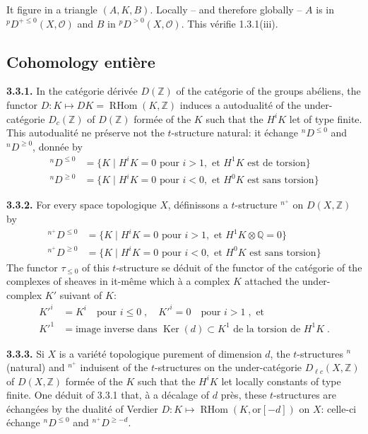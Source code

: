 \documentclass[12pt,a4paper]{article}
\theoremstyle{plain}
\theoremstyle{definition}
\DeclareMathOperator{\RHom}{RHom}
\DeclareMathOperator{\Ker}{Ker}
\newcommand{\cO}{\mathcal{O}}
\providecommand{\cO}{\mathcal{O}}
\providecommand{\Ker}{\operatorname{Ker}}
\providecommand{\RHom}{\operatorname{RHom}}
\begin{document}
It figure in a triangle $(A,K,B)$. Locally -- and therefore globally -- $A$ is in ${}^{p}D^{+ \leq 0}(X,\cO)$ and $B$ in ${}^{p}D^{> 0}(X,\cO)$. This v\'{e}rifie 1.3.1(iii).


\subsection{Cohomology enti\`{e}re}

\noindent\textbf{3.3.1.} In the cat\'{e}gorie d\'{e}riv\'{e}e $D(\mathbb{Z})$ of the cat\'{e}gorie of the groups ab\'{e}liens, the functor $D: K \mapsto DK = \RHom(K, \mathbb{Z})$ induces a autodualit\'{e} of the under-cat\'{e}gorie $D_{c}(\mathbb{Z})$ of $D(\mathbb{Z})$ form\'{e}e of the $K$ such that the $H^{i}K$ let of type finite. This autodualit\'{e} ne pr\'{e}serve not the $t$-structure natural: it \'{e}change $\phantom{}^{n}D^{\leq 0}$ and $\phantom{}^{n}D^{\geq 0}$, donn\'{e}e by
\begin{align*}
\phantom{}^{n}D^{\leq 0} &= \{K \mid H^{i}K = 0 \text{ pour } i > 1, \text{ et } H^{1}K \text{ est de torsion}\} \\
\phantom{}^{n}D^{\geq 0} &= \{K \mid H^{i}K = 0 \text{ pour } i < 0, \text{ et } H^{0}K \text{ est sans torsion}\}
\end{align*}

\noindent\textbf{3.3.2.} For every space topologique $X$, d\'{e}finissons a $t$-structure $\phantom{}^{n^{+}}$ on $D(X,\mathbb{Z})$ by
\begin{align*}
\phantom{}^{n^{+}}D^{\leq 0} &= \{K \mid H^{i}K = 0 \text{ pour } i > 1, \text{ et } H^{1}K \otimes \mathbb{Q} = 0\} \\
\phantom{}^{n^{+}}D^{\geq 0} &= \{K \mid H^{i}K = 0 \text{ pour } i < 0, \text{ et } H^{0}K \text{ est sans torsion}\}
\end{align*}
The functor $\tau_{\leq 0}$ of this $t$-structure se d\'{e}duit of the functor of the cat\'{e}gorie of the complexes of sheaves in it-m\^{e}me which \`{a} a complex $K$ attached the under-complex $K'$ suivant of $K$:
\begin{align*}
K'^{i} &= K^{i} \quad \text{pour } i \leq 0\;, \quad K'^{i} = 0 \quad \text{pour } i > 1\;, \text{ et} \\
K'^{1} &= \text{image inverse dans } \Ker(d) \subset K^{1} \text{ de la torsion de } H^{1}K\;.
\end{align*}

\noindent\textbf{3.3.3.} Si $X$ is a vari\'{e}t\'{e} topologique purement of dimension $d$, the $t$-structures $\phantom{}^{n}$ (natural) and $\phantom{}^{n^{+}}$ induisent of the $t$-structures on the under-cat\'{e}gorie $D_{\ell c}(X,\mathbb{Z})$ of $D(X,\mathbb{Z})$ form\'{e}e of the $K$ such that the $H^{i}K$ let locally constants of type finite. One d\'{e}duit of 3.3.1 that, \`{a} a d\'{e}calage of $d$ pr\`{e}s, these $t$-structures are \'{e}chang\'{e}es by the dualit\'{e} of Verdier $D: K \longmapsto \RHom(K, \mathrm{or}[-d])$ on $X$: celle-ci \'{e}change $\phantom{}^{n}D^{\leq 0}$ and $\phantom{}^{n^{+}}D^{\geq -d}$.
\end{document}
